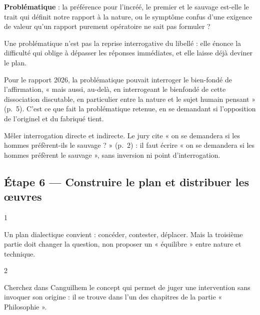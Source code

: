 \documentclass[11pt,a4paper]{article}
\begin{document}
\textbf{Problématique} : la préférence pour l'incréé, le premier et le sauvage est-elle le trait qui définit notre rapport à la nature, ou le symptôme confus d'une exigence de valeur qu'un rapport purement opératoire ne sait pas formuler ?

\begin{methode}

Une problématique n'est pas la reprise interrogative du libellé : elle énonce la difficulté qui oblige à dépasser les réponses immédiates, et elle laisse déjà deviner le plan.

\end{methode}

\begin{jury}

Pour le rapport 2026, la problématique pouvait interroger le bien-fondé de l'affirmation, « mais aussi, au-delà, en interrogeant le bienfondé de cette dissociation discutable, en particulier entre la nature et le sujet humain pensant » (p.~5). C'est ce que fait la problématique retenue, en se demandant si l'opposition de l'originel et du fabriqué tient.

\end{jury}

\begin{piege}

Mêler interrogation directe et indirecte. Le jury cite « on se demandera si les hommes préfèrent-ils le sauvage ? » (p.~2) : il faut écrire « on se demandera si les hommes préfèrent le sauvage », sans inversion ni point d'interrogation.

\end{piege}

\hypertarget{uxe9tape-6-construire-le-plan-et-distribuer-les-ux153uvres}{%
\subsection{Étape 6 --- Construire le plan et distribuer les œuvres}\label{uxe9tape-6-construire-le-plan-et-distribuer-les-ux153uvres}}

\begin{indication}{1}

Un plan dialectique convient : concéder, contester, déplacer. Mais la troisième partie doit changer la question, non proposer un « équilibre » entre nature et technique.

\end{indication}

\begin{indication}{2}

Cherchez dans Canguilhem le concept qui permet de juger une intervention sans invoquer son origine : il se trouve dans l'un des chapitres de la partie « Philosophie ».

\end{indication}
\end{document}
